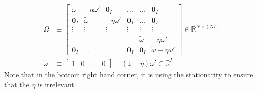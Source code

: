 \documentclass[11pt]{article}
\newcommand{\R}{\ensuremath{\mathbb{R}}}
\begin{document}
\begin{align}
\Omega &\equiv
\begin{bmatrix}
\tilde{\omega} & -\eta\omega' & \mathbf{0}_I & \ldots & \ldots & \mathbf{0}_I\\
\mathbf{0}_I & \tilde{\omega} & -\eta\omega'& \mathbf{0}_I & \ldots & \mathbf{0}_I\\
\vdots & \vdots & \vdots & \vdots & \vdots & \vdots\\
 & & &  & \tilde{\omega} & -\eta\omega'\\
\mathbf{0}_I & \ldots & & \mathbf{0}_I & \mathbf{0}_I & \tilde{\omega}-\eta\omega'
\end{bmatrix}\in \R^{N \times (N I)}\label{eq:vm-stacked-Omega-alt}\\
\tilde{\omega} &\equiv \begin{bmatrix}1 & 0 & \ldots & 0\end{bmatrix} - (1-\eta)\omega' \in \R^I\label{eq:tilde-omega-alt}
\end{align}
Note that in the bottom right hand corner, it is using the stationarity to ensure that the $\eta$ is irrelevant.
\end{document}
